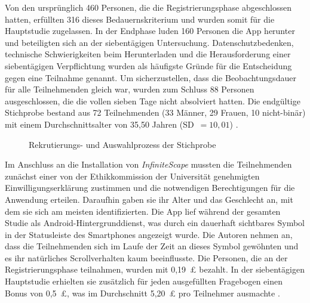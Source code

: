 \documentclass[11pt,a4paper]{article}
\begin{document}
Von den ursprünglich 460 Personen, die die Registrierungsphase abgeschlossen hatten,
erfüllten 316 dieses Bedauernskriterium und wurden somit für die Hauptstudie zugelassen. In
der Endphase luden 160 Personen die App herunter und beteiligten sich an der siebentägigen
Untersuchung. Datenschutzbedenken, technische Schwierigkeiten beim Herunterladen und die
Herausforderung einer siebentägigen Verpflichtung wurden als häufigste Gründe für die
Entscheidung gegen eine Teilnahme genannt. Um sicherzustellen, dass die Beobachtungsdauer
für alle Teilnehmenden gleich war, wurden zum Schluss 88 Personen ausgeschlossen, die die
vollen sieben Tage nicht absolviert hatten. Die endgültige Stichprobe bestand aus 72
Teilnehmenden (33 Männer, 29 Frauen, 10 nicht-binär) mit einem Durchschnittsalter von 35,50
Jahren (SD~$=10{,}01$) \citep{meinhardt2025scrolling}.

\begin{figure}[htbp]
  \centering
  \caption{Rekrutierungs- und Auswahlprozess der Stichprobe \citep{meinhardt2025scrolling}}
  \label{fig:recruitment-flow}
\end{figure}

\vspace{\baselineskip}

Im Anschluss an die Installation von \emph{InfiniteScape} mussten die Teilnehmenden zunächst
einer von der Ethikkommission der Universität genehmigten Einwilligungserklärung zustimmen
und die notwendigen Berechtigungen für die Anwendung erteilen. Daraufhin gaben sie ihr Alter
und das Geschlecht an, mit dem sie sich am meisten identifizierten. Die App lief während der
gesamten Studie als Android-Hintergrunddienst, was durch ein dauerhaft sichtbares Symbol in
der Statusleiste des Smartphones angezeigt wurde. Die Autoren nehmen an, dass die
Teilnehmenden sich im Laufe der Zeit an dieses Symbol gewöhnten und es ihr natürliches
Scrollverhalten kaum beeinflusste. Die Personen, die an der Registrierungsphase teilnahmen,
wurden mit 0,19~\pounds{} bezahlt. 
In der siebentägigen Hauptstudie erhielten sie zusätzlich für jeden ausgefüllten Fragebogen einen Bonus von 0,5~\pounds{}, was im Durchschnitt 5,20~\pounds{} pro Teilnehmer ausmachte \citep{meinhardt2025scrolling}.
\end{document}

